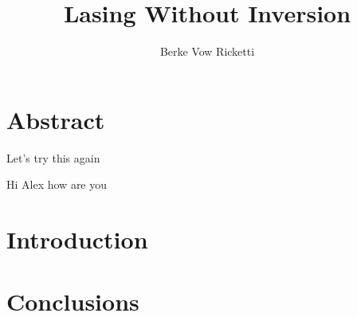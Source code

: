 \documentclass{article}
\title{Lasing Without Inversion}
\author{Berke Vow Ricketti}
\begin{document}
\maketitle{}





\section{Abstract}

Let's try this again


Hi Alex how are you
\section{Introduction}


\section{Conclusions}
\end{document}
